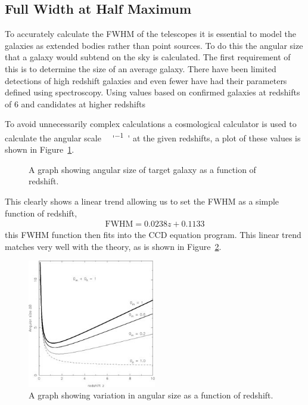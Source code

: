 
\subsection{Full Width at Half Maximum} %
\label{sub:full_width_at_half_maximum}
	To accurately calculate the FWHM of the telescopes it is essential to model the galaxies as extended bodies rather than point sources. To do this the angular size that a galaxy would subtend on the sky is calculated. The first requirement of this is to determine the size of an average galaxy. There have been limited detections of high redshift galaxies and even fewer have had their parameters defined using spectroscopy. Using values based on confirmed galaxies at redshifts of 6 and candidates at higher redshifts %

	To avoid unnecessarily complex calculations a cosmological calculator\cite{Ned_Calc} is used to calculate the angular scale \si{\kilo\parsec\per ''} at the given redshifts, a plot of these values is shown in Figure~\ref{fig:redshift_vs_angular_size}.
	\begin{figure}[!htbp]
		\centering
			\begingroup{}
				\resizebox{0.6\textwidth}{!}{%
					
				}\endgroup
		\caption{A graph showing angular size of target galaxy as a function of redshift.\label{fig:redshift_vs_angular_size}}
	\end{figure}

	This clearly shows a linear trend allowing us to set the FWHM as a simple function of redshift,
	\begin{align}
		\text{FWHM}= 0.0238z + 0.1133
	\end{align}
	this FWHM function then fits into the CCD equation program. This linear trend matches very well with the theory, as is shown in Figure~\ref{fig:angular_size_function_of_redshift}.
	\begin{figure}[!htbp]
		\centering
		\includegraphics[width=0.5\textwidth]{../Images/angular_size_function_of_redshift.jpeg}
		\caption{A graph showing variation in angular size as a function of redshift\cite{Sahni_FWHM}.\label{fig:angular_size_function_of_redshift}}
	\end{figure}

